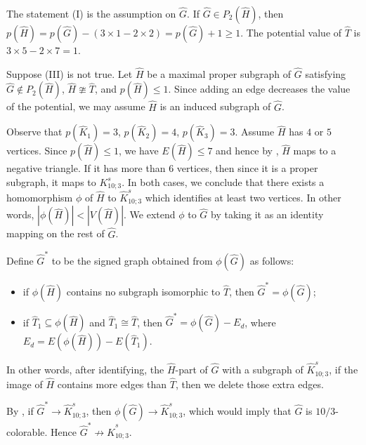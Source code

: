 \documentclass[11pt,a4paper]{article}
\makeatletter
\renewenvironment{proof}[1][\proofname]{\par
	\pushQED{\qed}%
	\normalfont \topsep6\p@\@plus6\p@\relax
	\trivlist
	\item[\hskip\labelsep
	\bfseries
	#1\@addpunct{.}]\ignorespaces
}{%
	\popQED\endtrivlist\@endpefalse
}
\theoremstyle{definition}
\makeatother
\begin{document}
\begin{proof}
	The statement (I) is the assumption on $\widehat{G}$.
	If $\widehat{G}\in P_2(\widehat{H})$, then $p(\widehat{H})=p(\widehat{G})-(3\times 1-2\times 2)=p(\widehat{G})+1\ge 1$. The potential value of $\widehat{T}$ is $3\times 5-2\times 7=1$.
	
	
	Suppose (III) is not true. Let $\widehat{H}$ be a maximal proper subgraph of $\widehat{G}$ satisfying $\widehat{G} \not\in P_2(\widehat{H})$, $\widehat{H}\ncong \widehat{T}$, and $p(\widehat{H})\leq 1$. Since adding an edge decreases the value of the potential, we may assume $\widehat{H}$ is an induced subgraph of $\widehat{G}$. 
	
	
	Observe that $p(\widehat{K}_1)=3$, $p(\widehat{K}_2)=4$, $p(\widehat{K}_3)=3$. Assume $\widehat{H}$ has $4$ or $5$ vertices. Since $p(\widehat{H})\leq 1$, we have $E(\widehat{H})\leq 7$ and hence  by , $\widehat{H}$ maps to a negative triangle. If it has more than $6$ vertices, then since it is a proper subgraph, it maps to $K_{10;3}^{s}$. In both cases, we conclude that there exists a homomorphism $\phi$ of $\widehat{H}$ to $\widehat{K}^s_{10;3}$ which identifies at least two vertices. In other words, $|\phi(\widehat{H})|<|V(\widehat{H})|$.
	We extend $\phi$ to $\widehat{G}$ by taking it as an identity mapping on the rest of $\widehat{G}$.
	
	
	
	Define $\widehat{G}^*$ to be the signed graph obtained from $\phi(\widehat{G})$ as follows: 
	\begin{itemize}
		\item if $\phi(\widehat{H})$ contains no subgraph isomorphic to $\widehat{T}$, then $\widehat{G}^*=\phi(\widehat{G})$;
		\item if $\widehat{T}_{1}\subseteq \phi(\widehat{H})$ and $\widehat{T}_1\cong \widehat{T}$, then $\widehat{G}^*=\phi(\widehat{G})-E_d$, where $E_d=E(\phi(\widehat{H}))-E(\widehat{T}_{1})$.
	\end{itemize}
	
	In other words, after identifying,  the $\widehat{H}$-part of $\widehat{G}$ with a subgraph of  $\widehat{K}^{s}_{10;3}$, if the image of $\widehat{H}$ contains more edges than $\widehat{T}$, then we delete those extra edges.
	
	
	
	By , if $\widehat{G}^*\to \widehat{K}^s_{10;3}$, then $\phi(\widehat{G})\to \widehat{K}^s_{10;3}$, which would imply that $\widehat{G}$ is $10/3$-colorable. Hence $\widehat{G}^*\not\to \widehat{K}^s_{10;3}$. 
	

\end{proof}
\end{document}
